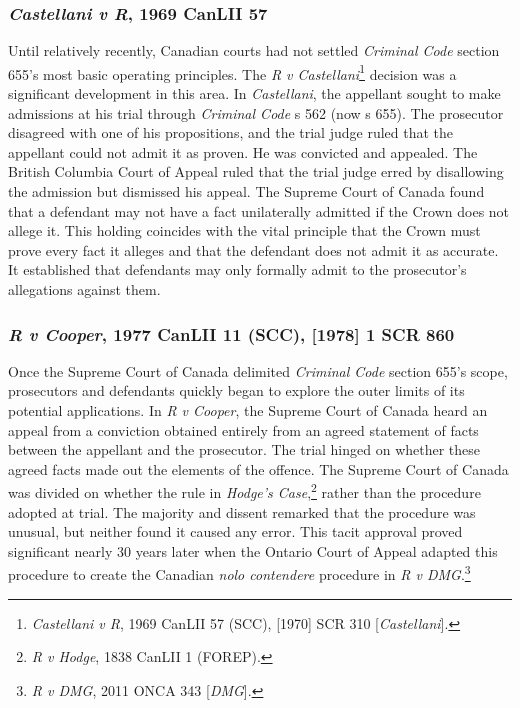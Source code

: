 \subsubsection{\textit{Castellani v R}, 1969 CanLII 57}

Until relatively recently, Canadian courts had not settled \textit{Criminal Code} section 655's most basic operating principles. The \textit{R v Castellani}\footnote{\textit{Castellani v R}, 1969 CanLII 57 (SCC), [1970] SCR 310 [\textit{Castellani}].} decision was a significant development in this area. In \textit{Castellani}, the appellant sought to make admissions at his trial through \textit{Criminal Code} s 562 (now s 655). The prosecutor disagreed with one of his propositions, and the trial judge ruled that the appellant could not admit it as proven. He was convicted and appealed. The British Columbia Court of Appeal ruled that the trial judge erred by disallowing the admission but dismissed his appeal. The Supreme Court of Canada found that a defendant may not have a fact unilaterally admitted if the Crown does not allege it. This holding coincides with the vital principle that the Crown must prove every fact it alleges and that the defendant does not admit it as accurate. It established that defendants may only formally admit to the prosecutor's allegations against them. 

\subsubsection{\textit{R v Cooper}, 1977 CanLII 11 (SCC), [1978] 1 SCR 860}

Once the Supreme Court of Canada delimited \textit{Criminal Code} section 655's scope, prosecutors and defendants quickly began to explore the outer limits of its potential applications. In \textit{R v Cooper}, the Supreme Court of Canada heard an appeal from a conviction obtained entirely from an agreed statement of facts between the appellant and the prosecutor. The trial hinged on whether these agreed facts made out the elements of the offence. The Supreme Court of Canada was divided on whether the rule in \textit{Hodge's Case},\footnote{\textit{R v Hodge}, 1838 CanLII 1 (FOREP).} rather than the procedure adopted at trial. The majority and dissent remarked that the procedure was unusual, but neither found it caused any error. This tacit approval proved significant nearly 30 years later when the Ontario Court of Appeal adapted this procedure to create the Canadian \textit{nolo contendere} procedure in \textit{R v DMG}.\footnote{\textit{R v DMG}, 2011 ONCA 343 [\textit{DMG}].}

